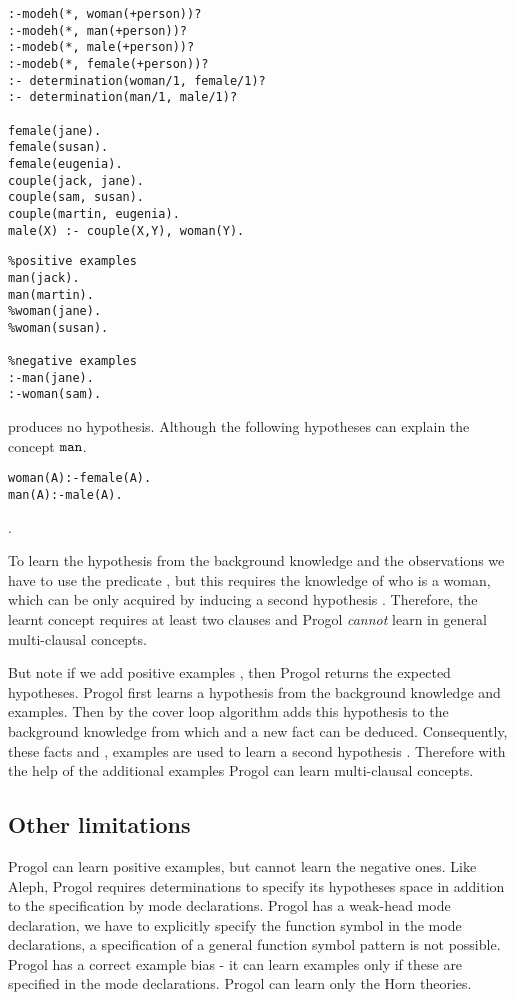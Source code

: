 \begin{minipage}[t]{.60\textwidth}
\begin{lstlisting}
:-modeh(*, woman(+person))?
:-modeh(*, man(+person))?
:-modeb(*, male(+person))?
:-modeb(*, female(+person))?
:- determination(woman/1, female/1)?
:- determination(man/1, male/1)?

female(jane).
female(susan).
female(eugenia).
couple(jack, jane).
couple(sam, susan).
couple(martin, eugenia).
male(X) :- couple(X,Y), woman(Y).\end{lstlisting}
\end{minipage}
\begin{minipage}[t]{.20\textwidth}
\begin{lstlisting}
%positive examples
man(jack).
man(martin).
%woman(jane).
%woman(susan).

%negative examples
:-man(jane).
:-woman(sam).
\end{lstlisting}
\end{minipage}

produces no hypothesis. Although the following hypotheses can explain the concept $\texttt{man}$.
\begin{lstlisting}
woman(A):-female(A).
man(A):-male(A).
\end{lstlisting}.

To learn the hypothesis  from the background knowledge and the observations we have to use the predicate , but this requires the knowledge of who is a woman, which can be only acquired by inducing a second hypothesis . Therefore, the learnt concept  requires at least two clauses and Progol \emph{cannot} learn in general multi-clausal concepts.

But note if we add positive examples ,  then Progol returns the expected hypotheses. Progol first learns a hypothesis  from the background knowledge and examples. Then by the cover loop algorithm adds this hypothesis to the background knowledge from which  and a new fact  can be deduced. Consequently, these facts and ,  examples are used to learn a second hypothesis . Therefore with the help of the additional examples Progol can learn multi-clausal concepts.

\subsection{Other limitations}
Progol can learn positive examples, but cannot learn the negative ones. Like Aleph, Progol requires determinations to specify its hypotheses space in addition to the specification by mode declarations. Progol has a weak-head mode declaration, we have to explicitly specify the function symbol in the mode declarations, a specification of a general function symbol pattern is not possible. Progol has a correct example bias - it can learn examples only if these are specified in the mode declarations. Progol can learn only the Horn theories.

